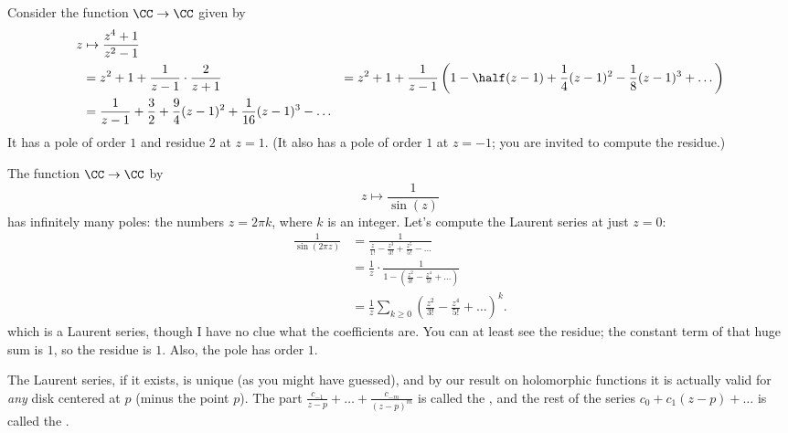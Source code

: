 \begin{example}
	Consider the function $\CC \to \CC$ given by
	\begin{align*}
		z &\mapsto \frac{z^4+1}{z^2-1} \\
		&= z^2 + 1 + \frac{1}{z-1} \cdot \frac{2}{z+1}
		&= z^2 + 1 + \frac1{z-1} 
		\left( 1 - \half(z-1) + \frac14(z-1)^2 - \frac18(z-1)^3 + \dots \right) \\
		&= \frac{1}{z-1} + \frac32 + \frac94(z-1)^2 + \frac{1}{16}(z-1)^3 - \dots
	\end{align*}
	It has a pole of order $1$ and residue $2$ at $z=1$.
	(It also has a pole of order $1$ at $z=-1$; you are invited to compute the residue.)
\end{example}
\begin{example}
	The function $\CC \to \CC$ by \[ z \mapsto \frac{1}{\sin(z)} \]
	has infinitely many poles: the numbers $z = 2\pi k$, where $k$ is an integer.
	Let's compute the Laurent series at just $z=0$:
	\begin{align*}
		\frac{1}{\sin(2\pi z)}
		&= \frac{1}{\frac{z}{1!} - \frac{z^3}{3!} + \frac{z^5}{5!} - \dots} \\
		&= \frac 1z \cdot \frac{1}{1 - \left( \frac{z^2}{3!} - \frac{z^4}{5!} + \dots \right)} \\
		&= \frac 1z \sum_{k \ge 0} \left( \frac{z^2}{3!} - \frac{z^4}{5!} + \dots \right)^k.
	\end{align*}
	which is a Laurent series, though I have no clue what the coefficients are.
	You can at least see the residue; the constant term of that huge sum is $1$,
	so the residue is $1$.
	Also, the pole has order $1$.
\end{example}

The Laurent series, if it exists, is unique (as you might have guessed),
and by our result on holomorphic functions it is actually valid for \emph{any}
disk centered at $p$ (minus the point $p$).
The part $\frac{c_{-1}}{z-p} + \dots + \frac{c_{-m}}{(z-p)^m}$ is called the ,
and the rest of the series $c_0 + c_1(z-p) + \dots$ is called the .



